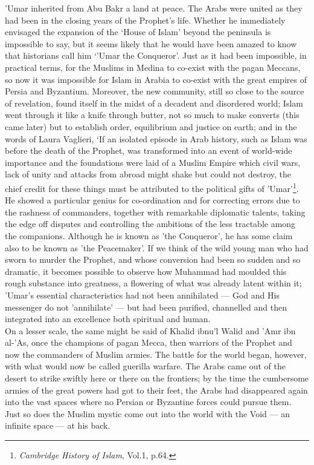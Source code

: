 \documentclass[10pt, twoside]{book}
\begin{document}
'Umar inherited from Abu Bakr a land at peace. The Arabs were united as they had been in the closing years of the Prophet's life. Whether he immediately envisaged the expansion of the `House of Islam' beyond the peninsula is impossible to say, but it seems likely that he would have been amazed to know that historians call him `'Umar the Conqueror'. Just as it had been impossible, in practical terms, for the Muslims in Medina to co\hyp{}exist with the pagan Meccans, so now it was impossible for Islam in Arabia to co\hyp{}exist with the great empires of Persia and Byzantium. Moreover, the new community, still so close to the source of revelation, found itself in the midst of a decadent and disordered world; Islam went through it like a knife through butter, not so much to make converts (this came later) but to establish order, equilibrium and justice on earth; and in the words of Laura Vaglieri, `If an isolated episode in Arab history, such as Islam was before the death of the Prophet, was transformed into an event of world\hyp{}wide importance and the foundations were laid of a Muslim Empire which civil wars, lack of unity and attacks from abroad might shake but could not destroy, the chief credit for these things must be attributed to the political gifts of 'Umar'\footnote{\emph{Cambridge History of Islam}, Vol.1, p.64.}. \\

He showed a particular genius for co-ordination and for correcting errors due to the rashness of commanders, together with remarkable diplomatic talents, taking the edge off disputes and controlling the ambitions of the less tractable among the companions. Although he is known as 'the Conqueror', he has some claim also to be known as 'the Peacemaker'. If we think of the wild young man who had sworn to murder the Prophet, and whose conversion had been so sudden and so dramatic, it becomes possible to observe how Muhammad had moulded this rough substance into greatness, a flowering of what was already latent within it; 'Umar's essential characteristics had not been annihilated --- God and His messenger do not 'annihilate' --- but had been purified, channelled and then integrated into an excellence both spiritual and human. \\

On a lesser scale, the same might be said of Khalid ibnu'l Walid and 'Amr ibn al\hyp{}'As, once the champions of pagan Mecca, then warriors of the Prophet and now the commanders of Muslim armies. The battle for the world began, however, with what would now be called guerilla warfare. The Arabs came out of the desert to strike swiftly here or there on the frontiers; by the time the cumbersome armies of the great powers had got to their feet, the Arabs had disappeared again into the vast spaces where no Persian or Byzantine forces could pursue them. Just so does the Muslim mystic come out into the world with the Void --- an infinite space --- at his back. \\
\end{document}
